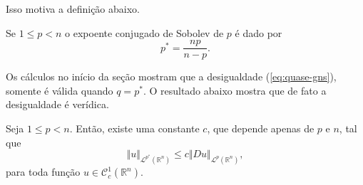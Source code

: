\documentclass[a4paper, 11pt]{book}
\theoremstyle{definition}
\newcommand{\bR}{\mathbb{R}}
\newcommand{\cC}{\mathcal{C}}
\newcommand{\cL}{\mathcal{L}}
\begin{document}
Isso motiva a definição abaixo.
\begin{dbox}
    Se $1 \leqslant p < n$ o expoente conjugado de Sobolev de $p$ é dado por
    \[
        p^* = \frac{np}{n - p}.
    \]
\end{dbox}

Os cálculos no início da seção mostram que a desigualdade (\ref{eq:quase-gns}), somente é válida quando $q = p^*$. O resultado abaixo mostra que de fato a desigualdade é verídica.

\begin{tbox} Seja $1 \leqslant p < n$. Então, existe uma constante $c$, que depende apenas de $p$ e $n$, tal que
\begin{equation} \label{eq:gns}
    \Vert u \Vert_{\cL^{p^*}(\bR^n)} \leqslant c \Vert Du \Vert_{\cL^p(\bR^n)},
\end{equation}
para toda função $u \in \cC^1_c(\bR^n)$.
\end{tbox}
\end{document}
